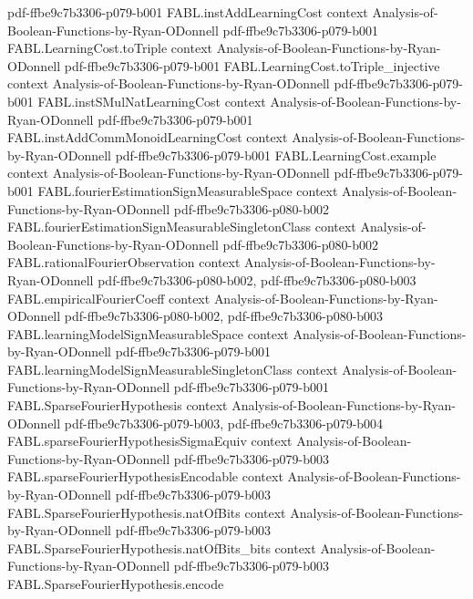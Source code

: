 \begin{theorem}
  {pdf-ffbe9c7b3306-p079-b001}
\proofstep
  {FABL.instAddLearningCost}
  {context}
  {Analysis-of-Boolean-Functions-by-Ryan-ODonnell}
  {pdf-ffbe9c7b3306-p079-b001}
\proofstep
  {FABL.LearningCost.toTriple}
  {context}
  {Analysis-of-Boolean-Functions-by-Ryan-ODonnell}
  {pdf-ffbe9c7b3306-p079-b001}
\proofstep
  {FABL.LearningCost.toTriple_injective}
  {context}
  {Analysis-of-Boolean-Functions-by-Ryan-ODonnell}
  {pdf-ffbe9c7b3306-p079-b001}
\proofstep
  {FABL.instSMulNatLearningCost}
  {context}
  {Analysis-of-Boolean-Functions-by-Ryan-ODonnell}
  {pdf-ffbe9c7b3306-p079-b001}
\proofstep
  {FABL.instAddCommMonoidLearningCost}
  {context}
  {Analysis-of-Boolean-Functions-by-Ryan-ODonnell}
  {pdf-ffbe9c7b3306-p079-b001}
\proofstep
  {FABL.LearningCost.example}
  {context}
  {Analysis-of-Boolean-Functions-by-Ryan-ODonnell}
  {pdf-ffbe9c7b3306-p079-b001}
\proofstep
  {FABL.fourierEstimationSignMeasurableSpace}
  {context}
  {Analysis-of-Boolean-Functions-by-Ryan-ODonnell}
  {pdf-ffbe9c7b3306-p080-b002}
\proofstep
  {FABL.fourierEstimationSignMeasurableSingletonClass}
  {context}
  {Analysis-of-Boolean-Functions-by-Ryan-ODonnell}
  {pdf-ffbe9c7b3306-p080-b002}
\proofstep
  {FABL.rationalFourierObservation}
  {context}
  {Analysis-of-Boolean-Functions-by-Ryan-ODonnell}
  {pdf-ffbe9c7b3306-p080-b002,
    pdf-ffbe9c7b3306-p080-b003}
\proofstep
  {FABL.empiricalFourierCoeff}
  {context}
  {Analysis-of-Boolean-Functions-by-Ryan-ODonnell}
  {pdf-ffbe9c7b3306-p080-b002,
    pdf-ffbe9c7b3306-p080-b003}
\proofstep
  {FABL.learningModelSignMeasurableSpace}
  {context}
  {Analysis-of-Boolean-Functions-by-Ryan-ODonnell}
  {pdf-ffbe9c7b3306-p079-b001}
\proofstep
  {FABL.learningModelSignMeasurableSingletonClass}
  {context}
  {Analysis-of-Boolean-Functions-by-Ryan-ODonnell}
  {pdf-ffbe9c7b3306-p079-b001}
\proofstep
  {FABL.SparseFourierHypothesis}
  {context}
  {Analysis-of-Boolean-Functions-by-Ryan-ODonnell}
  {pdf-ffbe9c7b3306-p079-b003,
    pdf-ffbe9c7b3306-p079-b004}
\proofstep
  {FABL.sparseFourierHypothesisSigmaEquiv}
  {context}
  {Analysis-of-Boolean-Functions-by-Ryan-ODonnell}
  {pdf-ffbe9c7b3306-p079-b003}
\proofstep
  {FABL.sparseFourierHypothesisEncodable}
  {context}
  {Analysis-of-Boolean-Functions-by-Ryan-ODonnell}
  {pdf-ffbe9c7b3306-p079-b003}
\proofstep
  {FABL.SparseFourierHypothesis.natOfBits}
  {context}
  {Analysis-of-Boolean-Functions-by-Ryan-ODonnell}
  {pdf-ffbe9c7b3306-p079-b003}
\proofstep
  {FABL.SparseFourierHypothesis.natOfBits_bits}
  {context}
  {Analysis-of-Boolean-Functions-by-Ryan-ODonnell}
  {pdf-ffbe9c7b3306-p079-b003}
\proofstep
  {FABL.SparseFourierHypothesis.encode}

\end{theorem}
